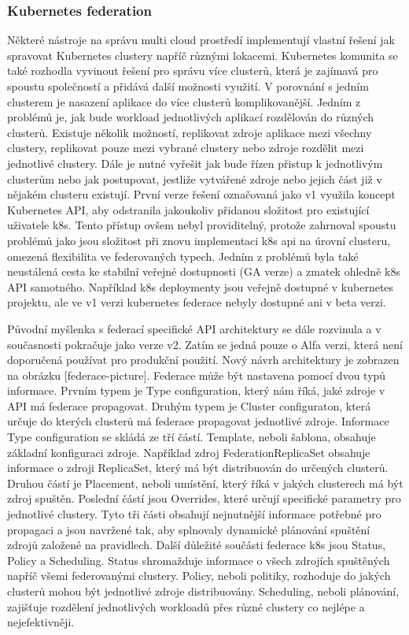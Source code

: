 \subsubsection{Kubernetes federation}
Některé nástroje na správu multi cloud prostředí implementují vlastní řešení jak spravovat Kubernetes clustery napříč různými lokacemi. Kubernetes komunita se také rozhodla vyvinout řešení pro správu více clusterů, která je zajímavá pro spoustu společností a přidává další možnosti využití. V porovnání s jedním clusterem je nasazení aplikace do více clusterů komplikovanější. Jedním z problémů je, jak bude workload jednotlivých aplikací rozdělován do různých clusterů. Existuje několik možností, replikovat zdroje aplikace mezi všechny clustery, replikovat pouze mezi vybrané clustery nebo zdroje rozdělit mezi jednotlivé clustery. Dále je nutné vyřešit jak bude řízen přistup k jednotlivým clusterům nebo jak postupovat, jestliže vytvářené zdroje nebo jejich část již v nějakém clusteru existují. První verze řešení označovaná jako v1 využila koncept Kubernetes API, aby odstranila jakoukoliv přidanou složitost pro existující uživatele k8s. Tento přístup ovšem nebyl providitelný, protože zahrnoval spoustu problémů jako jsou složitost při znovu implementaci k8s api na úrovní clusteru, omezená flexibilita ve federovaných typech. Jedním z problémů byla také neustálená cesta ke stabilní veřejné dostupnosti (GA verze) a zmatek ohledně k8s API samotného. Například k8s deploymenty jsou veřejně dostupné v kubernetes projektu, ale ve v1 verzi kubernetes federace nebyly dostupné ani v beta verzi. \par
    Původní myšlenka s federací specifické API architektury se dále rozvinula a v současnosti pokračuje jako verze v2. Zatím se jedná pouze o Alfa verzi, která není doporučená používat pro produkční použití. Nový návrh architektury je zobrazen na obrázku [federace-picture]. Federace může být nastavena pomocí dvou typů informace. Prvním typem je Type configuration, který nám říká, jaké zdroje v API má federace propagovat. Druhým typem je Cluster configuraton, která určuje do kterých clusterů má federace propagovat jednotlivé zdroje. Informace Type configuration se skládá ze tří částí. Template, neboli šablona, obsahuje základní konfiguraci zdroje. Například zdroj FederationReplicaSet obsahuje informace o zdroji ReplicaSet, který má být distribuován do určených clusterů. Druhou částí je Placement, neboli umístění, který říká v jakých clusterech má být zdroj spuštěn. Poslední částí jsou Overrides, které určují specifické parametry pro jednotlivé clustery. Tyto tři části obsahují nejnutnější informace potřebné pro propagaci a jsou navržené tak, aby splnovaly dynamické plánování spuštění zdrojů založené na pravidlech. Další důležité součásti federace k8s jsou Status, Policy a Scheduling. Status shromažduje informace o všech zdrojích spuštěných napříč všemi federovanými clustery. Policy, neboli politiky, rozhoduje do jakých clusterů mohou být jednotlivé zdroje distribuovány. Scheduling, neboli plánování, zajišťuje rozdělení jednotlivých workloadů přes různé clustery co nejlépe a nejefektivněji.\par 
